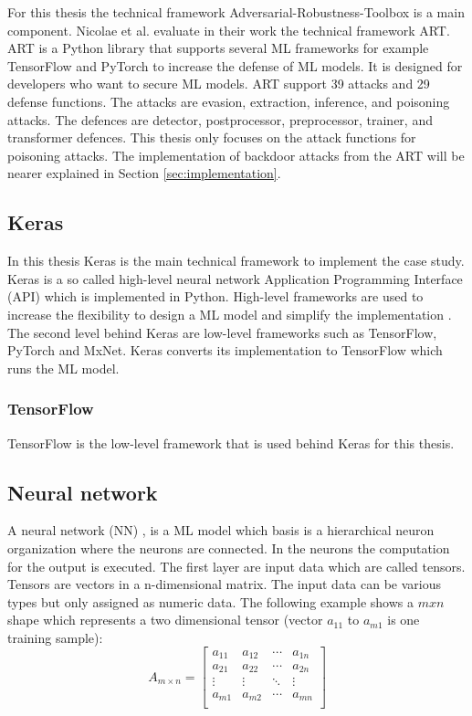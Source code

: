 For this thesis the technical framework Adversarial-Robustness-Toolbox \cite{art2018} is a main component. Nicolae et al. \cite{DBLP:journals/corr/abs-1807-01069} evaluate in their work
the technical framework ART. ART is a Python library that supports several ML frameworks for example TensorFlow and PyTorch to increase the defense of ML models. It is designed for developers who want to secure ML models. ART support 39 attacks and 29 defense functions. The attacks are evasion, extraction, inference, and poisoning attacks. The defences are detector, postprocessor, preprocessor, trainer, and transformer defences. This thesis only focuses on the attack functions for poisoning attacks. The implementation of backdoor attacks from the ART will be nearer explained in Section \ref{sec:implementation}.

\subsection{Keras}

In this thesis Keras is the main technical framework to implement the case study. Keras is a so called high-level neural network Application Programming Interface (API) which is implemented in Python. High-level frameworks are used to increase the flexibility to design a ML model and simplify the implementation \cite{moolayil_2019}. The second level behind Keras are low-level frameworks such as TensorFlow, PyTorch and MxNet. Keras converts its implementation to TensorFlow which runs the ML model.

\subsubsection*{TensorFlow}

TensorFlow is the low-level framework that is used behind Keras \cite{moolayil_2019} for this thesis.

\subsection{Neural network}

A neural network (NN) \cite{Maas2013RectifierNI}, \cite{DBLP:journals/corr/ZhangZLS17} is a ML model which basis is a hierarchical neuron organization where the neurons are connected. In the neurons the computation for the output is executed.
The first layer are input data which are called tensors. Tensors are vectors in a n-dimensional matrix. The input data can be various types but only assigned as numeric data. The following example shows a $m x n$ shape which represents a two dimensional tensor (vector $a_{11}$ to $a_{m1}$ is one training sample):
\[
  A_{m\times n} =
  \left[ {\begin{array}{cccc}
    a_{11} & a_{12} & \cdots & a_{1n}\\
    a_{21} & a_{22} & \cdots & a_{2n}\\
    \vdots & \vdots & \ddots & \vdots\\
    a_{m1} & a_{m2} & \cdots & a_{mn}\\
  \end{array} } \right]
\]

